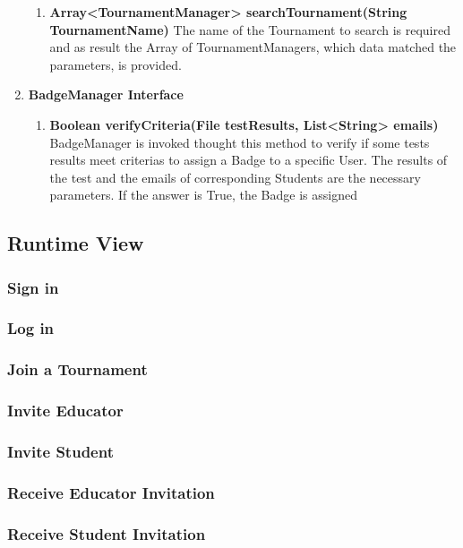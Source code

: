\begin{enumerate}
\begin{enumerate}[label=$\bullet$]
            \item \textbf{Array<TournamentManager> searchTournament(String TournamentName)} The name of the Tournament to search is required and as result the Array of TournamentManagers, which data matched the parameters, is provided.
        \end{enumerate}
    \item \textbf{BadgeManager Interface}
        \begin{enumerate}[label=$\bullet$]
            \item \textbf{Boolean verifyCriteria(File testResults, List<String> emails)} BadgeManager is invoked thought this method to verify if some tests results meet criterias to assign a Badge to a specific User. The results of the test and the emails of corresponding Students are the necessary parameters. If the answer is True, the Badge is assigned
        \end{enumerate}
\end{enumerate}
\subsection{Runtime View}
\subsubsection{Sign in}
\subsubsection{Log in}
\subsubsection{Join a Tournament}
\subsubsection{Invite Educator}
\subsubsection{Invite Student}
\subsubsection{Receive Educator Invitation}
\subsubsection{Receive Student Invitation}
